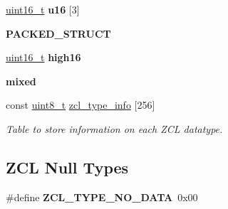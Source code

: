 \begin{DoxyCompactItemize}
\hyperlink{group__hal__dos_ga5a8b2dc9e45a9ee81a94ef304fb62505}{uint16\+\_\+t} {\bfseries u16} \mbox{[}3\mbox{]}
\item 
{\bfseries P\+A\+C\+K\+E\+D\+\_\+\+S\+T\+R\+U\+CT}
\item 
\mbox{\label{group__zcl__types_ga8496547ebd48f63b4a6d8a8bd059c89e}} 
\hyperlink{group__hal__dos_ga5a8b2dc9e45a9ee81a94ef304fb62505}{uint16\+\_\+t} {\bfseries high16}
\item 
\mbox{\label{group__zcl__types_ga1c5d0403e0a7a57d3778e56e8798faa8}} 
{\bfseries mixed}
\item 
const \hyperlink{group__hal__dos_gae1affc9ca37cfb624959c866a73f83c2}{uint8\+\_\+t} \hyperlink{group__zcl__types_ga0f5737f60f1f37fb3b375e9fd5fe664d}{zcl\+\_\+type\+\_\+info} \mbox{[}256\mbox{]}
\begin{DoxyCompactList}\small\item\em Table to store information on each Z\+CL datatype. \end{DoxyCompactList}\end{DoxyCompactItemize}
\subsection*{Z\+CL Null Types}
\begin{DoxyCompactItemize}
\item 
\mbox{\label{group__zcl__types_ga6f933afd1ace68cae2aec5373a960a72}} 
\#define {\bfseries Z\+C\+L\+\_\+\+T\+Y\+P\+E\+\_\+\+N\+O\+\_\+\+D\+A\+TA}~0x00
\end{DoxyCompactItemize}
